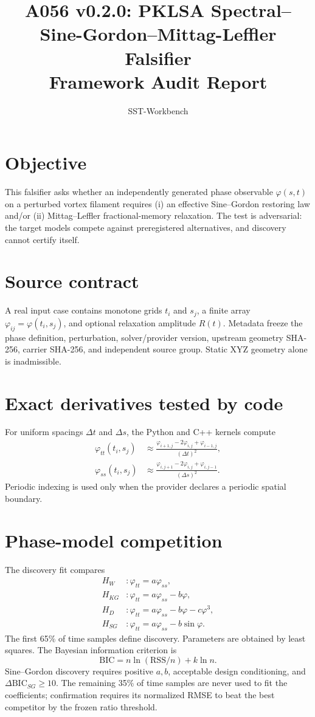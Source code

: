 \documentclass[11pt]{article}
\title{A056 v0.2.0: PKLSA Spectral--Sine-Gordon--Mittag-Leffler Falsifier\\Framework Audit Report}
\author{SST-Workbench}
\date{}
\begin{document}
\maketitle

\section{Objective}
This falsifier asks whether an independently generated phase observable $\varphi(s,t)$ on a perturbed vortex filament requires (i) an effective Sine--Gordon restoring law and/or (ii) Mittag--Leffler fractional-memory relaxation.  The test is adversarial: the target models compete against preregistered alternatives, and discovery cannot certify itself.

\section{Source contract}
A real input case contains monotone grids $t_i$ and $s_j$, a finite array $\varphi_{ij}=\varphi(t_i,s_j)$, and optional relaxation amplitude $R(t)$.  Metadata freeze the phase definition, perturbation, solver/provider version, upstream geometry SHA-256, carrier SHA-256, and independent source group.  Static XYZ geometry alone is inadmissible.

\section{Exact derivatives tested by code}
For uniform spacings $\Delta t$ and $\Delta s$, the Python and C++ kernels compute
\begin{align}
\varphi_{tt}(t_i,s_j)&\approx\frac{\varphi_{i+1,j}-2\varphi_{i,j}+\varphi_{i-1,j}}{(\Delta t)^2},\\
\varphi_{ss}(t_i,s_j)&\approx\frac{\varphi_{i,j+1}-2\varphi_{i,j}+\varphi_{i,j-1}}{(\Delta s)^2}.
\end{align}
Periodic indexing is used only when the provider declares a periodic spatial boundary.

\section{Phase-model competition}
The discovery fit compares
\begin{align}
H_W &: \varphi_{tt}=a\varphi_{ss},\\
H_{KG} &: \varphi_{tt}=a\varphi_{ss}-b\varphi,\\
H_D &: \varphi_{tt}=a\varphi_{ss}-b\varphi-c\varphi^3,\\
H_{SG} &: \varphi_{tt}=a\varphi_{ss}-b\sin\varphi.
\end{align}
The first 65\% of time samples define discovery.  Parameters are obtained by least squares.  The Bayesian information criterion is
\begin{equation}
\mathrm{BIC}=n\ln(\mathrm{RSS}/n)+k\ln n.
\end{equation}
Sine--Gordon discovery requires positive $a,b$, acceptable design conditioning, and $\Delta\mathrm{BIC}_{SG}\ge10$.  The remaining 35\% of time samples are never used to fit the coefficients; confirmation requires its normalized RMSE to beat the best competitor by the frozen ratio threshold.
\end{document}
